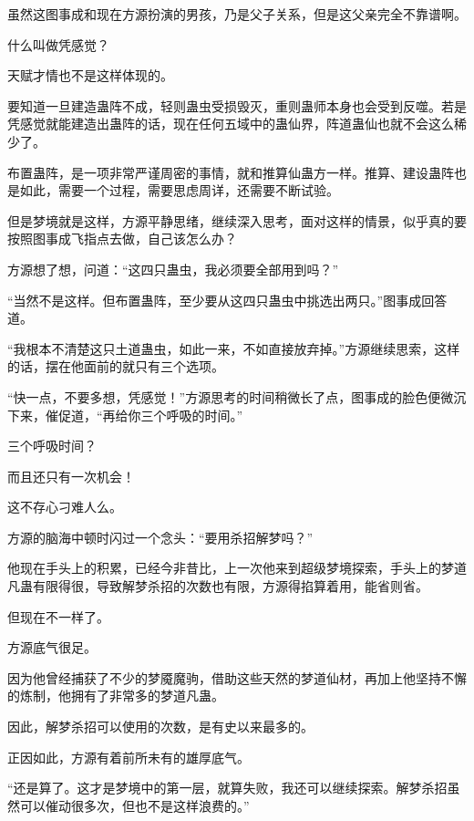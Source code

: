 
\begin{this_body}



虽然这图事成和现在方源扮演的男孩，乃是父子关系，但是这父亲完全不靠谱啊。

什么叫做凭感觉？

天赋才情也不是这样体现的。

要知道一旦建造蛊阵不成，轻则蛊虫受损毁灭，重则蛊师本身也会受到反噬。若是凭感觉就能建造出蛊阵的话，现在任何五域中的蛊仙界，阵道蛊仙也就不会这么稀少了。

布置蛊阵，是一项非常严谨周密的事情，就和推算仙蛊方一样。推算、建设蛊阵也是如此，需要一个过程，需要思虑周详，还需要不断试验。

但是梦境就是这样，方源平静思绪，继续深入思考，面对这样的情景，似乎真的要按照图事成飞指点去做，自己该怎么办？

方源想了想，问道：“这四只蛊虫，我必须要全部用到吗？”

“当然不是这样。但布置蛊阵，至少要从这四只蛊虫中挑选出两只。”图事成回答道。

“我根本不清楚这只土道蛊虫，如此一来，不如直接放弃掉。”方源继续思索，这样的话，摆在他面前的就只有三个选项。

“快一点，不要多想，凭感觉！”方源思考的时间稍微长了点，图事成的脸色便微沉下来，催促道，“再给你三个呼吸的时间。”

三个呼吸时间？

而且还只有一次机会！

这不存心刁难人么。

方源的脑海中顿时闪过一个念头：“要用杀招解梦吗？”

他现在手头上的积累，已经今非昔比，上一次他来到超级梦境探索，手头上的梦道凡蛊有限得很，导致解梦杀招的次数也有限，方源得掐算着用，能省则省。

但现在不一样了。

方源底气很足。

因为他曾经捕获了不少的梦魇魔驹，借助这些天然的梦道仙材，再加上他坚持不懈的炼制，他拥有了非常多的梦道凡蛊。

因此，解梦杀招可以使用的次数，是有史以来最多的。

正因如此，方源有着前所未有的雄厚底气。

“还是算了。这才是梦境中的第一层，就算失败，我还可以继续探索。解梦杀招虽然可以催动很多次，但也不是这样浪费的。”


\end{this_body}
